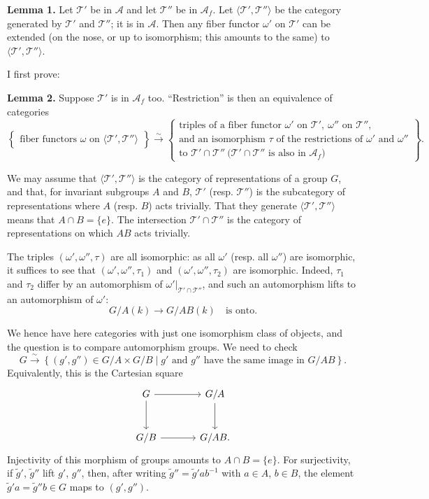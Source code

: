 \documentclass[11pt]{article}
\newcommand{\T}{\mathcal T}
\newcommand{\A}{\mathcal A}
\newcommand{\Af}{\mathcal A_f}
\begin{document}
\textbf{Lemma 1.} Let \(\T'\) be in \(\A\) and let \(\T''\) be in \(\Af\). Let \(\langle\T',\T''\rangle\) be the category generated by \(\T'\) and \(\T''\); it is in \(\A\). Then any fiber functor \(\omega'\) on \(\T'\) can be extended (on the nose, or up to isomorphism; this amounts to the same) to \(\langle\T',\T''\rangle\).

I first prove:

\textbf{Lemma 2.} Suppose \(\T'\) is in \(\Af\) too. ``Restriction'' is then an equivalence of categories
\[
\left\{
\begin{array}{c}
\text{fiber functors }\omega\text{ on }\langle\T',\T''\rangle
\end{array}
\right\}
\xrightarrow{\sim}
\left\{
\begin{array}{c}
\text{triples of a fiber functor }\omega'\text{ on }\T',\ \omega''\text{ on }\T'',\\
\text{and an isomorphism }\tau\text{ of the restrictions of }\omega'\text{ and }\omega''\\
\text{to }\T'\cap\T''\ \bigl(\T'\cap\T''\text{ is also in }\Af\bigr)
\end{array}
\right\}.
\]

We may assume that \(\langle\T',\T''\rangle\) is the category of representations of a group \(G\), and that, for invariant subgroups \(A\) and \(B\), \(\T'\) (resp. \(\T''\)) is the subcategory of representations where \(A\) (resp. \(B\)) acts trivially. That they generate \(\langle\T',\T''\rangle\) means that \(A\cap B=\{e\}\). The intersection \(\T'\cap\T''\) is the category of representations on which \(AB\) acts trivially.

The triples \((\omega',\omega'',\tau)\) are all isomorphic: as all \(\omega'\) (resp. all \(\omega''\)) are isomorphic, it suffices to see that \((\omega',\omega'',\tau_1)\) and \((\omega',\omega'',\tau_2)\) are isomorphic. Indeed, \(\tau_1\) and \(\tau_2\) differ by an automorphism of \(\omega'|_{\T'\cap\T''}\), and such an automorphism lifts to an automorphism of \(\omega'\):
\[
G/A(k)\longrightarrow G/AB(k)\quad\text{is onto.}
\]

We hence have here categories with just one isomorphism class of objects, and the question is to compare automorphism groups. We need to check
\[
G\xrightarrow{\sim}\left\{(g',g'')\in G/A\times G/B\mid g'\text{ and }g''\text{ have the same image in }G/AB\right\}.
\]
Equivalently, this is the Cartesian square
\[
\begin{tikzcd}[column sep=large,row sep=large]
G \arrow[r] \arrow[d] & G/A \arrow[d] \\
G/B \arrow[r] & G/AB .
\end{tikzcd}
\]
Injectivity of this morphism of groups amounts to \(A\cap B=\{e\}\). For surjectivity, if \(\widetilde g'\), \(\widetilde g''\) lift \(g'\), \(g''\), then, after writing \(\widetilde g''=\widetilde g'ab^{-1}\) with \(a\in A\), \(b\in B\), the element \(\widetilde g'a=\widetilde g''b\in G\) maps to \((g',g'')\).
\end{document}
